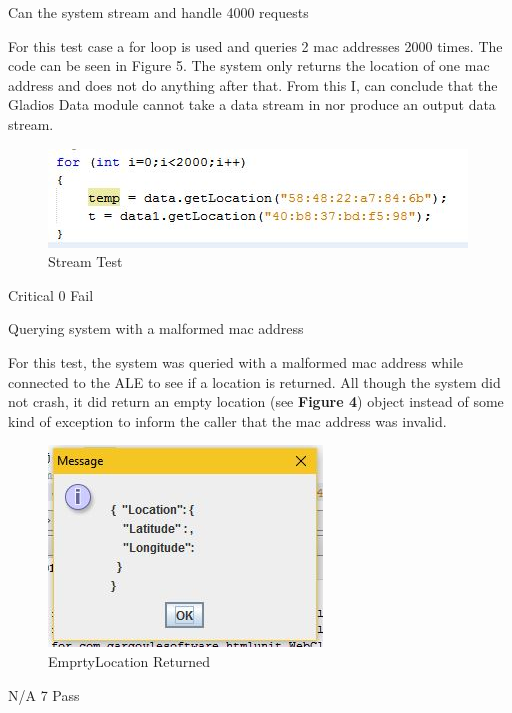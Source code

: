 \FuncReq
{Can the system stream and handle 4000 requests} 
{For this test case a for loop is used and queries 2 mac addresses 2000 times. The code can be seen in Figure 5. The system only returns the location of one mac address and does not do anything after that. From this I, can conclude that the Gladios Data module cannot take a data stream in nor produce an output data stream.
	\begin{figure}[h]
		\centering
		\includegraphics{functional/images/stream_test.jpg}
		\caption{Stream Test}
		\label{fig:Output}
	\end{figure} 
}
{Critical}
{0}
{Fail}	

\FuncReq
{Querying system with a malformed mac address}
{For this test, the system was queried with a malformed mac address while connected to the ALE to see if a location is returned. All though the system did not crash, it did return an empty location (see \textbf{Figure 4}) object instead of some kind of exception to inform the caller that the mac address was invalid.
			\begin{figure}[h]
				\centering
				\includegraphics{functional/images/wrong_mac.jpg}
				\caption{EmprtyLocation Returned}
				\label{fig:LocationReturned}
			\end{figure}
}
{N/A}
{7}
{Pass}

